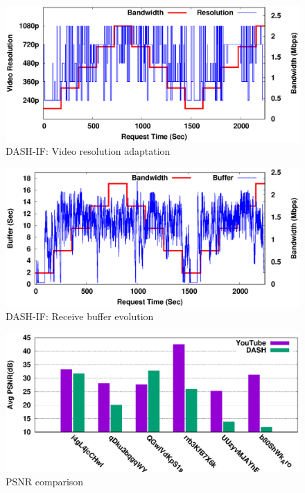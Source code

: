 \begin{figure}[!t]
	\centering
	\includegraphics[scale=0.7]{img/replay/resolutionchange}
	\caption{\acs{DASH-IF}: Video resolution adaptation}
	\label{fig:reply-reso}
\end{figure}

\begin{figure}[!t]
	\centering
	\includegraphics[scale=0.7]{img/replay/bufferchange}
	\caption{\acs{DASH-IF}: Receive buffer evolution}
	\label{fig:buf_reply}
\end{figure}

\begin{figure}[!t]
	\centering
	\includegraphics[scale=0.7]{img/plot_qoe}
	\caption{\acs{PSNR} comparison}
	\label{fig:qoe_ytds}
\end{figure}



